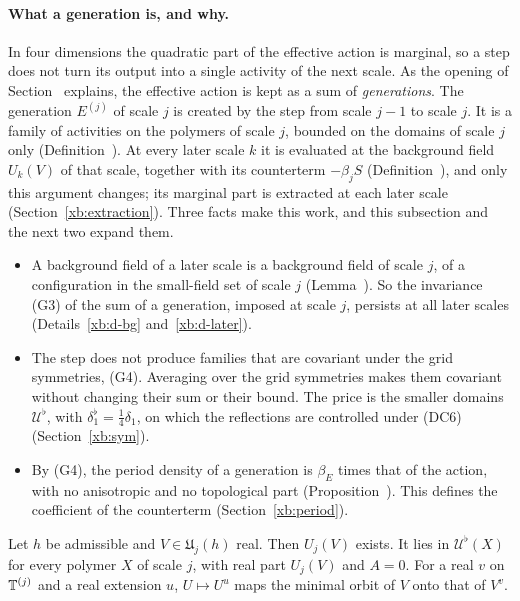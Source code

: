 \paragraph{What a generation is, and why.} In four dimensions the quadratic part of the effective action is marginal, so a step does not turn its output into a single activity of the next scale. As the opening of Section~ explains, the effective action is kept as a sum of \emph{generations}. The generation $E^{(j)}$ of scale $j$ is created by the step from scale $j-1$ to scale $j$. It is a family of activities on the polymers of scale $j$, bounded on the domains of scale $j$ only (Definition~). At every later scale $k$ it is evaluated at the background field $U_k(V)$ of that scale, together with its counterterm $-\beta_jS$ (Definition~), and only this argument changes; its marginal part is extracted at each later scale (Section~\ref{xb:extraction}). Three facts make this work, and this subsection and the next two expand them.
\begin{itemize}
\item A background field of a later scale is a background field of scale $j$, of a configuration in the small-field set of scale $j$ (Lemma~). So the invariance (G3) of the sum of a generation, imposed at scale $j$, persists at all later scales (Details~\ref{xb:d-bg} and~\ref{xb:d-later}).
\item The step does not produce families that are covariant under the grid symmetries, (G4). Averaging over the grid symmetries makes them covariant without changing their sum or their bound. The price is the smaller domains $\mathcal U^\flat$, with $\delta_1^\flat=\frac14\delta_1$, on which the reflections are controlled under (DC6) (Section~\ref{xb:sym}).
\item By (G4), the period density of a generation is $\beta_E$ times that of the action, with no anisotropic and no topological part (Proposition~). This defines the coefficient of the counterterm (Section~\ref{xb:period}).
\end{itemize}

\begin{detail}\label{xb:d-bg}
Let $h$ be admissible and $V\in\mathfrak U_j(h)$ real. Then $U_j(V)$ exists. It lies in $\mathcal U^\flat(X)$ for every polymer $X$ of scale $j$, with real part $U_j(V)$ and $A=0$. For a real $v$ on $\mathbb T^{(j)}$ and a real extension $u$, $U\mapsto U^u$ maps the minimal orbit of $V$ onto that of $V^v$.
\end{detail}

